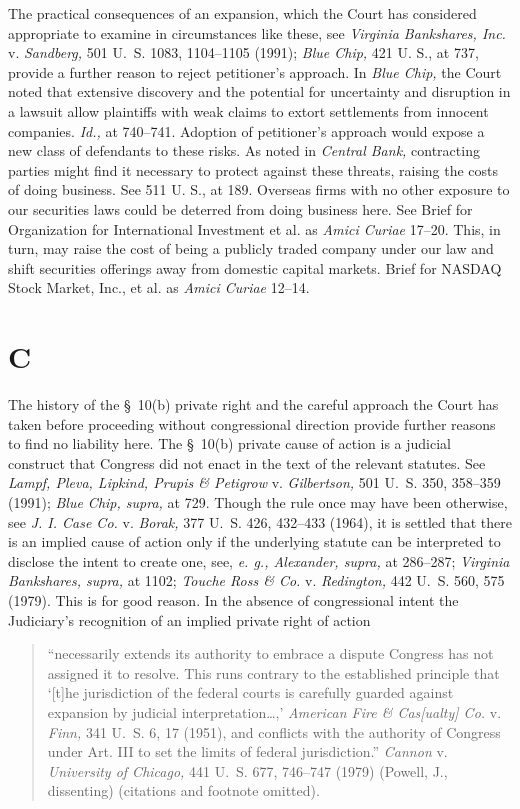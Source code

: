   The practical consequences of an expansion, which the Court has considered appropriate to examine in circumstances like these, see \emph{Virginia Bankshares, Inc.} v. \emph{Sandberg,} 501 U.~S. 1083, 1104--1105 (1991); \emph{Blue Chip,} 421 U. S., at 737, provide a further reason to reject petitioner's approach. In \emph{Blue Chip,} the Court noted that extensive discovery and the potential for uncertainty and disruption in a lawsuit allow plaintiffs with weak claims to extort settlements from innocent companies. \emph{Id.,} at 740--741. Adoption \newpage  of petitioner's approach would expose a new class of defendants to these risks. As noted in \emph{Central Bank,} contracting parties might find it necessary to protect against these threats, raising the costs of doing business. See 511 U. S., at 189. Overseas firms with no other exposure to our securities laws could be deterred from doing business here. See Brief for Organization for International Investment et al. as \emph{Amici Curiae} 17--20. This, in turn, may raise the cost of being a publicly traded company under our law and shift securities offerings away from domestic capital markets. Brief for NASDAQ Stock Market, Inc., et al. as \emph{Amici Curiae} 12--14.

\section{C}

  The history of the \S~10(b) private right and the careful approach the Court has taken before proceeding without congressional direction provide further reasons to find no liability here. The \S~10(b) private cause of action is a judicial construct that Congress did not enact in the text of the relevant statutes. See \emph{Lampf, Pleva, Lipkind, Prupis \& Petigrow} v. \emph{Gilbertson,} 501 U.~S. 350, 358--359 (1991); \emph{Blue Chip, supra,} at 729. Though the rule once may have been otherwise, see \emph{J. I. Case Co.} v. \emph{Borak,} 377 U.~S. 426, 432--433 (1964), it is settled that there is an implied cause of action only if the underlying statute can be interpreted to disclose the intent to create one, see, \emph{e. g., Alexander, supra,} at 286--287; \emph{Virginia Bankshares, supra,} at 1102; \emph{Touche Ross \& Co.} v. \emph{Redington,} 442 U.~S. 560, 575 (1979). This is for good reason. In the absence of congressional intent the Judiciary's recognition of an implied private right of action

    \begin{quote}

		``necessarily extends its authority to embrace a dispute Congress has not assigned it to resolve. This runs contrary to the established principle that ‘[t]he jurisdiction of the federal courts is carefully guarded against expansion by judicial interpretation\dots ,' \emph{American Fire \& Cas[ualty] Co.} v. \emph{Finn,} 341 U.~S. 6, 17 (1951), and con\newpage flicts with the authority of Congress under Art. III to set the limits of federal jurisdiction.'' \emph{Cannon} v. \emph{University of Chicago,} 441 U.~S. 677, 746--747 (1979) (Powell, J., dissenting) (citations and footnote omitted).

    \end{quote}

